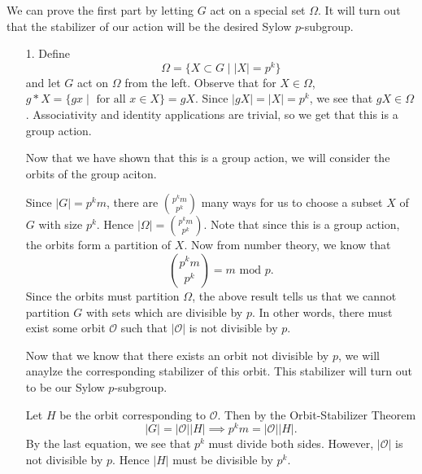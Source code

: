     \begin{prf}
        \textcolor{NavyBlue}{We can prove the first part by letting
        $G$ act on a special set $\Omega$. It will turn out that the
        stabilizer of our action will be the desired Sylow
        $p$-subgroup.}
        
        \begin{itemize}
            \item[1.] Define 
            \[
                \Omega = \{ X \subset G \mid |X| = p^k\}
            \] 
            and let $G$ act on $\Omega$ from the
            left. Observe that for $X \in \Omega$, $g * X = \{gx \mid
            \text{ for all } x \in X\} = gX.$ Since $|gX| = |X| = p^k$, we
            see that $gX \in \Omega$. Associativity and identity
            applications are trivial, so we get that this is a group
            action.
            
            \textcolor{NavyBlue}{Now that we have shown that this is a
            group action, we will consider the orbits of the group
            aciton.}
            
            Since $|G| = p^km$, there are $\displaystyle
            \binom{p^km}{p^k}$ many ways for us to choose a subset $X$
            of $G$ with size $p^k$. Hence $|\Omega| = \displaystyle
            \binom{p^km}{p^k}$. Note that since this is a group action, the
            orbits form a partition of $X$. Now from number theory, we
            know that 
            \[
                \binom{p^km}{p^k} = m \mbox{ mod } p.
            \]
            Since the orbits must partition $\Omega$, the above result
            tells us that we cannot partition $G$ with sets which are
            divisible by $p$. In other words, there must exist some
            orbit $\mathcal{O}$
            such that $|\mathcal{O}|$ is not divisible by $p$. 

            \textcolor{NavyBlue}{Now that we know that there exists an
            orbit not divisible by $p$, we will anaylze the
            corresponding stabilizer of this orbit. This stabilizer
            will turn out to be our Sylow $p$-subgroup. }

            Let $H$ be the orbit corresponding to $\mathcal{O}$. Then
            by the Orbit-Stabilizer Theorem 
            \[
                |G| = |\mathcal{O}||H| \implies p^km = |\mathcal{O}||H|.                
            \]
            By the last equation, we see that $p^k$ must divide both
            sides. However, $|\mathcal{O}|$ is not divisible by $p$.
            Hence $|H|$ must be divisible by $p^k$.
            

\end{itemize}
\end{prf}
